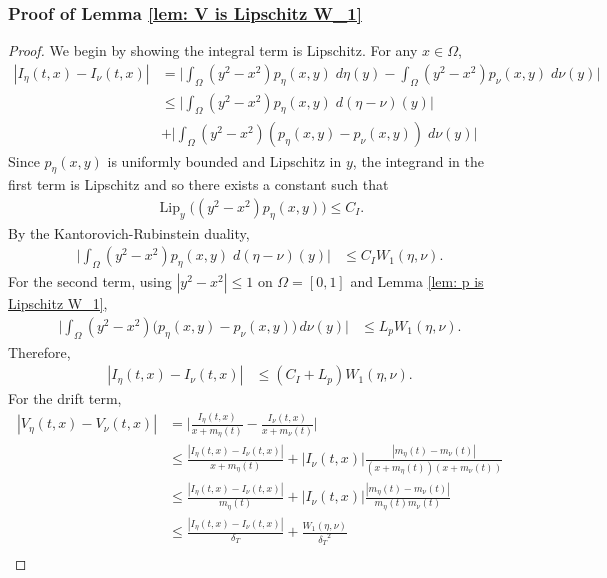 \documentclass[10pt]{article}
\begin{document}
\subsubsection*{Proof of Lemma \ref{lem: V is Lipschitz W_1}}
\begin{proof}
    We begin by showing the integral term is Lipschitz. For any $x\in \Omega$,
\begin{align*}
    |I_{\eta}(t,x) - I_{\nu}(t,x)|&= \Big| \int_\Omega(y^2-x^2)p_{\eta}(x,y)\;d\eta(y) - \int_\Omega(y^2-x^2)p_{\nu}(x,y)\;d\nu(y)\Big|\\
   &\leq \Big| \int_\Omega(y^2-x^2)p_{\eta}(x,y)\;d(\eta-\nu)(y)\Big|\\ &+ \Big| \int_\Omega(y^2-x^2)(p_{\eta}(x,y)-p_{\nu}(x,y))\;d\nu(y)\Big|
\end{align*}
Since $p_\eta(x,y)$ is uniformly bounded and Lipschitz in $y$, the integrand in the first term is Lipschitz and so there exists a constant such that 
\begin{align*}
    \operatorname{Lip}_y\bigg((y^2-x^2)p_\eta(x,y)\bigg) \leq C_I.
\end{align*}
By the Kantorovich-Rubinstein duality, 
\begin{align*}
    \bigg|\int_\Omega (y^2 -x^2) p_\eta(x,y) \; d(\eta-\nu)(y)\bigg| &\leq C_I W_1(\eta,\nu).
\end{align*}
For the second term, using $|y^2-x^2|\leq 1$ on $\Omega = [0,1]$ and Lemma \ref{lem: p is Lipschitz W_1},
\begin{align*}
    \bigg|\int_\Omega (y^2-x^2)\big(p_\eta(x,y) -p_\nu(x,y)\big)\, d\nu(y) \bigg| &\leq L_p W_1(\eta,\nu).
\end{align*}
Therefore,
\begin{align*}
    |I_{\eta}(t,x) - I_{\nu}(t,x)|&\leq (C_I + L_p) W_1(\eta,\nu). 
\end{align*}
For the drift term, 
\begin{align*}
    |V_{\eta}(t,x) - V_{\nu}(t,x)| &= \bigg| \frac{I_{\eta}(t,x)}{x+m_{\eta}(t)} - \frac{I_{\nu}(t,x)}{x+m_{\nu}(t)}\bigg| 
    \\
    &\leq \frac{|I_{\eta}(t,x)- I_{\nu}(t,x)|}{x+m_{\eta}(t)} + |I_{\nu}(t,x)|\frac{|m_{\eta}(t)-m_{\nu}(t)|}{(x+m_{\eta}(t))(x+m_{\nu}(t))}\\
    &\leq \frac{|I_{\eta}(t,x) - I_{\nu}(t,x)|}{m_{\eta}(t)} + |I_{\nu}(t,x)|\frac{|m_{\eta}(t)-m_{\nu}(t)|}{m_{\eta}(t)m_{\nu}(t)}\\
    &\leq \frac{|I_{\eta}(t,x)- I_{\nu}(t,x)|}{\delta_T} + \frac{W_1(\eta,\nu)}{{\delta_T}^2}\\

\end{align*}
\end{proof}
\end{document}
